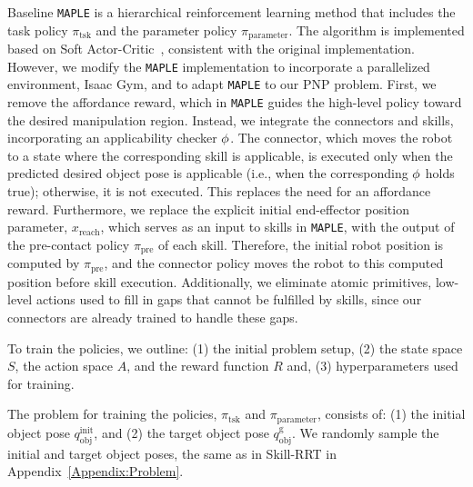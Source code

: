 Baseline \texttt{MAPLE} is a hierarchical reinforcement learning method that includes the task policy \( \pi_\text{tsk} \) and the parameter policy \( \pi_\text{parameter} \). The algorithm is implemented based on Soft Actor-Critic~\cite{haarnoja2018soft}, consistent with the original implementation. However, we modify the \texttt{MAPLE} implementation to incorporate a parallelized environment, Isaac Gym, and to adapt \texttt{MAPLE} to our PNP problem. First, we remove the affordance reward, which in \texttt{MAPLE} guides the high-level policy toward the desired manipulation region. Instead, we integrate the connectors and skills, incorporating an applicability checker \(\phi\). The connector, which moves the robot to a state where the corresponding skill is applicable, is executed only when the predicted desired object pose is applicable (i.e., when the corresponding \(\phi\) holds true); otherwise, it is not executed. This replaces the need for an affordance reward. Furthermore, we replace the explicit initial end-effector position parameter, \( x_{\text{reach}} \), which serves as an input to skills in \texttt{MAPLE}, with the output of the pre-contact policy \( \pi_\text{pre} \) of each skill. Therefore, the initial robot position is computed by \( \pi_\text{pre} \), and the connector policy moves the robot to this computed position before skill execution. Additionally, we eliminate atomic primitives, low-level actions used to fill in gaps that cannot be fulfilled by skills, since our connectors are already trained to handle these gaps.

To train the policies, we outline: (1) the initial problem setup, (2) the state space \( S \), the action space \( A \), and the reward function \( R \) and, (3) hyperparameters used for training. 

The problem for training the policies, \( \pi_\text{tsk} \) and \( \pi_\text{parameter} \), consists of: (1) the initial object pose \( q^\text{init}_\text{obj} \), and (2) the target object pose \( q^\text{g}_\text{obj} \). We randomly sample the initial and target object poses, the same as in Skill-RRT in Appendix~\ref{Appendix:Problem}.

